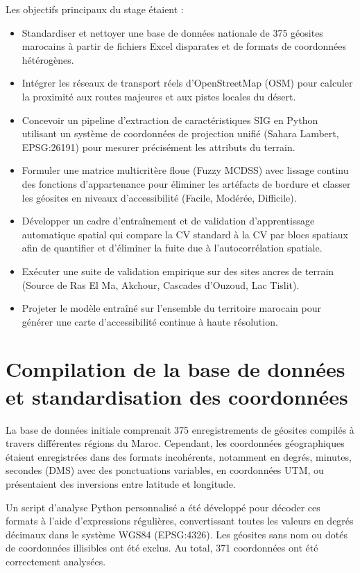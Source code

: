 \documentclass[11pt,twocolumn,a4paper]{article}
\begin{document}
Les objectifs principaux du stage étaient :
\begin{itemize}
    \item Standardiser et nettoyer une base de données nationale de 375 géosites marocains à partir de fichiers Excel disparates et de formats de coordonnées hétérogènes.
    \item Intégrer les réseaux de transport réels d'OpenStreetMap (OSM) pour calculer la proximité aux routes majeures et aux pistes locales du désert.
    \item Concevoir un pipeline d'extraction de caractéristiques SIG en Python utilisant un système de coordonnées de projection unifié (Sahara Lambert, EPSG:26191) pour mesurer précisément les attributs du terrain.
    \item Formuler une matrice multicritère floue (Fuzzy MCDSS) avec lissage continu des fonctions d'appartenance pour éliminer les artéfacts de bordure et classer les géosites en niveaux d'accessibilité (Facile, Modérée, Difficile).
    \item Développer un cadre d'entraînement et de validation d'apprentissage automatique spatial qui compare la CV standard à la CV par blocs spatiaux afin de quantifier et d'éliminer la fuite due à l'autocorrélation spatiale.
    \item Exécuter une suite de validation empirique sur des sites ancres de terrain (Source de Ras El Ma, Akchour, Cascades d'Ouzoud, Lac Tislit).
    \item Projeter le modèle entraîné sur l'ensemble du territoire marocain pour générer une carte d'accessibilité continue à haute résolution.
\end{itemize}

\section{Compilation de la base de données et standardisation des coordonnées}
La base de données initiale comprenait 375 enregistrements de géosites compilés à travers différentes régions du Maroc. Cependant, les coordonnées géographiques étaient enregistrées dans des formats incohérents, notamment en degrés, minutes, secondes (DMS) avec des ponctuations variables, en coordonnées UTM, ou présentaient des inversions entre latitude et longitude.

Un script d'analyse Python personnalisé a été développé pour décoder ces formats à l'aide d'expressions régulières, convertissant toutes les valeurs en degrés décimaux dans le système WGS84 (EPSG:4326). Les géosites sans nom ou dotés de coordonnées illisibles ont été exclus. Au total, 371 coordonnées ont été correctement analysées.
\end{document}
